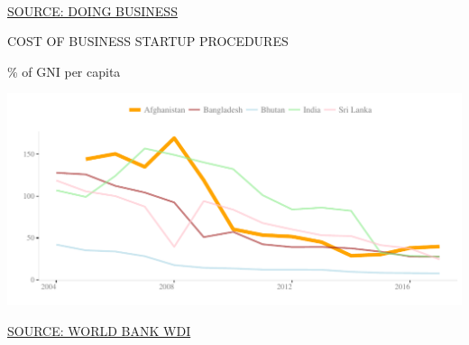 \documentclass{article}\usepackage[]{graphicx}\usepackage[]{color}
\makeatletter
\def\maxwidth{ %
  \ifdim\Gin@nat@width>\linewidth
    \linewidth
  \else
    \Gin@nat@width
  \fi
}
\makeatother
\begin{document}
\begin{minipage}[b]{0.95\textwidth}
\begin{minipage}[c]{0.50\textwidth}
{      }
    \\[6pt]
     \hspace{1ex}\scriptsize{\href{http://www.doingbusiness.org}{\textcolor[HTML]{22A6F5}{SOURCE: DOING BUSINESS}}}
  \end{minipage}
    \begin{minipage}[c]{0.42\textwidth} 
    \hspace{4ex}\small{\textcolor[HTML]{818181}{COST OF BUSINESS STARTUP PROCEDURES}}
    
    \hspace{4ex}\footnotesize{\textcolor[HTML]{818181}{\% of GNI per capita}}


\hfill{}\includegraphics[width=\maxwidth]{figure/line_chart_Policy-1} 



    \hspace{4ex}\scriptsize{\href{http://data.worldbank.org}{\textcolor[HTML]{22A6F5}{SOURCE: WORLD BANK WDI}}} 
  \end{minipage}
\end{minipage}

\end{document}
